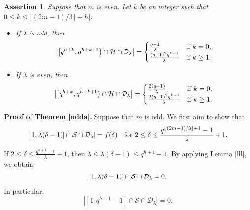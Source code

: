 \documentclass[journal,onecolumn]{IEEEtran}
\newtheorem{assertion}{Assertion}
\begin{document}
\begin{assertion}\label{as3.5}
Suppose that $m$ is even. Let $k$ be an integer such that   $0\leq k\leq \lfloor (2m-1)/3\rfloor-h]$. 
 \begin{itemize}
 \item    If $\lambda$ is odd, then 
 \begin{equation}
   \left| \left[q^{h+k}, q^{h+k+1}\right)\cap \mathcal{H}\cap \mathcal{D}_{\lambda}\right| =\begin{cases}
    \frac{q-1}{\lambda}  & \hbox{if }k=0, \\
       \frac{(q-1)^2q^{k-1}}{\lambda} & \hbox{if }k\geq 1.      
   \end{cases} 
\end{equation}
\item If $\lambda$ is even, then 
\begin{equation}
   \left| \left[q^{h+k}, q^{h+k+1}\right)\cap \mathcal{H}\cap \mathcal{D}_{\lambda}\right| =\begin{cases}
\frac{2(q-1)}{\lambda}     & \hbox{if }k=0,\\
         \frac{2(q-1)^2q^{k-1}}{\lambda}& \hbox{if }k\geq 1.    
   \end{cases} 
\end{equation}

 \end{itemize}
\end{assertion}





 
\noindent\textbf{Proof of Theorem \ref{odda}.} Suppose that $m$ is odd. We first aim to show that 
\begin{equation}\label{dz}
   \left| \left[1,\lambda(\delta-1)\right]\cap \mathcal{S}\cap \mathcal{D}_{\lambda} \right|=f(\delta) \quad \hbox{for } 2\leq \delta\leq \frac{q^{\lfloor (2m-1)/3\rfloor+1}-1}{\lambda}+1.
\end{equation}

If  $ 2\leq \delta \leq  \frac{q^{h+1}-1}{\lambda}+1$, then  $\lambda\leq \lambda(\delta-1)\leq  q^{h+1}-1$. By applying Lemma \ref{lll}, we obtain 
\begin{equation}\notag
    [1,\lambda(\delta-1)]\cap \mathcal{S}\cap \mathcal{D}_{\lambda}=0.
\end{equation}
In particular, 
    \begin{equation}\label{zjd}
  \left|\left[1,q^{h+1}-1\right]\cap \mathcal{S}\cap \mathcal{D}_{\lambda}\right| =0.
\end{equation}
\end{document}
